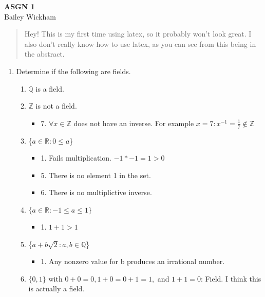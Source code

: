 \documentclass[a4paper]{article}
\begin{document}
\begin{center}
    {\LARGE \bf ASGN 1\\}
    {\large Bailey Wickham}
\end{center}
\begin{abstract}
    Hey! This is my first time using latex, so it probably won't look great. I also don't really know how to use latex, as you can see from this being in the abstract.
    
\end{abstract}
\begin{enumerate}
    \item Determine if the following are fields.
\begin{enumerate}
    \item $\mathbb{Q}$ is a field.
    \item $\mathbb{Z}$ is not a field.
        \begin{itemize}
            \item  7. $\forall x \in \mathbb{Z}$ does not have an inverse. For example $x = 7 : x^{-1} = \frac{1}{7} \not\in \mathbb{Z}$
        \end{itemize}
    \item \{$a \in \mathbb{R}: 0 \le a$\} 
        \begin{itemize}
            \item 1. Fails multiplication. $-1 * -1 = 1 > 0$
            \item 5. There is no element 1 in the set.
            \item 6. There is no multiplictive inverse. 
        \end{itemize} 
    \item $\{a \in \mathbb{R}: -1 \le a \le 1\} $
        \begin{itemize}
            \item 1. $1 + 1 > 1$
        \end{itemize}
    \item \{$a + b\sqrt{2}: a,b \in \mathbb{Q}$\}
        \begin{itemize}
            \item 1. Any nonzero value for b produces an irrational number.
        \end{itemize}
    \item $\{0,1\} $ with $0 + 0 = 0, 1 + 0 = 0 + 1 = 1,$ and $1 + 1 = 0$:  Field. 
        I think this is actually a field.


\end{enumerate}
\end{enumerate}
\end{document}
